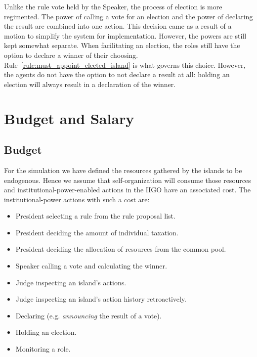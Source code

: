 Unlike the rule vote held by the Speaker, the process of election is more regimented. The power of calling a vote for an election and the power of declaring the result are combined into one action. This decision came as a result of a motion to simplify the system for implementation. However, the powers are still kept somewhat separate. When facilitating an election, the roles still have the option to declare a winner of their choosing. Rule~\ref{rule:must_appoint_elected_island} is what governs this choice. However, the agents do not have the option to not declare a result at all: holding an election will always result in a declaration of the winner.

\section{Budget and Salary}
\subsection{Budget}

For the simulation we have defined the resources gathered by the islands to be endogenous. Hence we assume that self-organization will consume those resources and institutional-power-enabled actions in the IIGO have an associated cost. The institutional-power actions with such a cost are:




\begin{itemize}
\item President selecting a rule from the rule proposal list.
\item President deciding the amount of individual taxation.
\item President deciding the allocation of resources from the common pool.
\item Speaker calling a vote and calculating the winner.
\item Judge inspecting an island's actions.
\item Judge inspecting an island's action history retroactively.
\item Declaring (e.g. \textit{announcing} the result of a vote).
\item Holding an election.
\item Monitoring a role.
\end{itemize}

